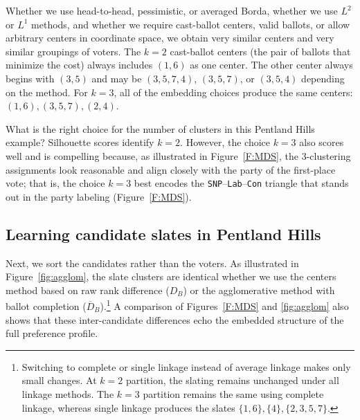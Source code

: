 \documentclass{amsart}
\newcommand{\dcand}{D_B}
\newcommand{\dcandbar}{\overline{D}_B}
\newcommand{\bb}{\mathfrak{b}}
\newcommand{\hh}{\mathfrak{h}}
\newcommand{\Con}{{\tt Con}\xspace}
\newcommand{\SNP}{{\tt SNP}\xspace}
\newcommand{\Lab}{{\tt Lab}\xspace}
\theoremstyle{plain}
\theoremstyle{definition}
\theoremstyle{remark}
\begin{document}
Whether we use head-to-head,  pessimistic, or averaged Borda, whether we use $L^2$ or $L^1$ methods, and whether we require cast-ballot centers, valid ballots, or allow arbitrary centers in coordinate space, we obtain very similar centers and very similar groupings of voters.    %
The $k=2$ cast-ballot centers (the pair of ballots that minimize the cost) always includes $(1,6)$ as one center.  The other center always begins with $(3,5)$ and may be $(3,5,7,4)$, $(3,5,7)$, or $(3,5,4)$ depending on the method.
For $k=3$, all of the embedding choices produce the same centers: $(1, 6), (3, 5, 7), (2, 4)$.



What is the right choice for the number of clusters in this Pentland Hills example?  
Silhouette scores identify $k=2$.  However, the choice $k=3$ also scores well and is compelling because, as illustrated in Figure~\ref{F:MDS}, the  $3$-clustering assignments look reasonable and align closely with the party of the first-place vote; that is, the choice $k=3$ best encodes the \SNP--\Lab--\Con triangle that stands out in the party labeling (Figure~\ref{F:MDS}).  



\FloatBarrier
\subsection{Learning candidate slates in Pentland Hills}

Next, we sort the candidates rather than the voters.  
As illustrated in Figure~\ref{fig:agglom}, the slate clusters are identical whether we use the centers method based on raw rank difference ($\dcand$) or the agglomerative method with ballot completion ($\dcandbar$).\footnote{Switching to complete or single linkage instead of average linkage makes only small changes.  At $k=2$ partition, the slating  remains unchanged under all linkage methods. The $k=3$  partition remains the same using complete linkage, whereas single linkage produces the slates 
$\{1,6\}, \{4\}, \{2,3,5,7\}$.}  A comparison of Figures~\ref{F:MDS} and \ref{fig:agglom} also shows that these inter-candidate differences echo the embedded structure of the full preference profile.
\end{document}
